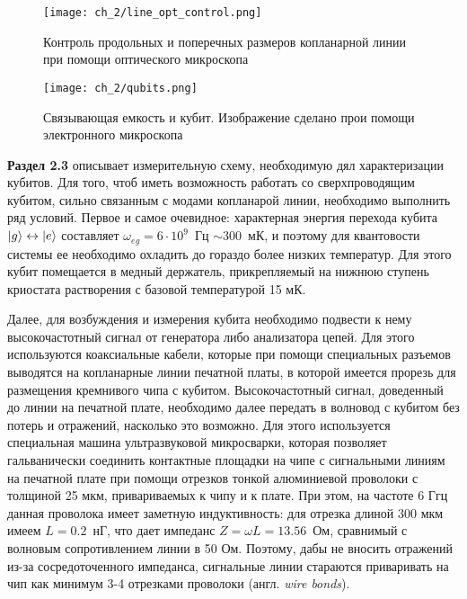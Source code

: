 \begin{figure}[htb]\center
	\texttt{[image: ch\_2/line\_opt\_control.png]} \hfill
	\caption[width=0.6\textwidth]{Контроль продольных и поперечных размеров копланарной линии при помощи оптического микроскопа}
	\label{fig: line}
\end{figure}

\begin{figure}[htb]\center
	\texttt{[image: ch\_2/qubits.png]} \hfill
	\caption[width=0.6\textwidth]{Связывающая емкость и кубит. Изображение сделано прои помощи электронного микроскопа}
	\label{fig: qubits}
\end{figure}
\textbf{Раздел 2.3} описывает измерительную схему, необходимую дял характеризации кубитов. Для того, чтоб иметь возможность работать со сверхпроводящим кубитом, сильно связанным с модами копланарой линии, необходимо выполнить ряд условий.
Первое и самое очевидное: характерная энергия перехода кубита $\ket{g} \leftrightarrow \ket{e}$ составляет $\omega_{eg}=6\cdot 10^{9}$~Гц $\sim 300$~мК, и поэтому для квантовости системы ее необходимо охладить до гораздо более низких температур. Для этого кубит помещается в медный держатель, прикрепляемый на нижнюю ступень криостата растворения с базовой температурой 15 мК.

Далее, для возбуждения и измерения кубита необходимо подвести к нему высокочастотный сигнал от генератора либо анализатора цепей. Для этого используются коаксиальные кабели, которые при помощи специальных разъемов выводятся на копланарные линии печатной платы, в которой имеется прорезь для размещения кремнивого чипа с кубитом. Высокочастотный сигнал, доведенный до линии на печатной плате, необходимо далее передать в волновод с кубитом без потерь и отражений, насколько это возможно. Для этого используется специальная машина ультразвуковой микросварки, которая позволяет гальванически соединить контактные площадки на чипе с сигнальными линиям на печатной плате при помощи отрезков тонкой алюминиевой проволоки с толщиной 25 мкм, привариваемых к чипу и к плате. При этом, на частоте 6 Ггц данная проволока имеет заметную индуктивность: для отрезка длиной 300 мкм имеем $L=0.2$~нГ, что дает импеданс $Z = \omega L= 13.56$~Ом, сравнимый с волновым сопротивлением линии в 50 Ом. Поэтому, дабы не вносить отражений из-за сосредоточенного импеданса, сигнальные линии стараются приваривать на чип как минимум 3-4 отрезками проволоки (англ. \textit{wire bonds}).

